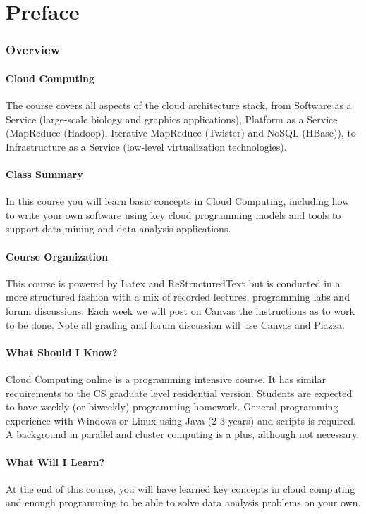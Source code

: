\part{Preface}

\section{Overview}

\subsection{Cloud Computing}
The course covers all aspects of the cloud architecture stack, from Software as
a Service (large-scale biology and graphics applications), Platform as a
Service (MapReduce (Hadoop), Iterative MapReduce (Twister) and NoSQL (HBase)),
to Infrastructure as a Service (low-level virtualization technologies).

\subsection{Class Summary}
In this course you will learn basic concepts in Cloud Computing, including how
to write your own software using key cloud programming models and tools to
support data mining and data analysis applications.

\subsection{Course Organization}
This course is powered by Latex and ReStructuredText but is conducted in a
more structured fashion with a mix of recorded lectures, programming labs and
forum discussions. Each week we will post on Canvas the instructions as to
work to be done. Note all grading and forum discussion will use Canvas and
Piazza.

\subsection{What Should I Know?}
Cloud Computing online is a programming intensive course. It has similar
requirements to the CS graduate level residential version. Students are
expected to have weekly (or biweekly) programming homework. General programming
experience with Windows or Linux using Java (2-3 years) and scripts is
required. A background in parallel and cluster computing is a plus, although
not necessary.

\subsection{What Will I Learn?}
At the end of this course, you will have learned key concepts in cloud
computing and enough programming to be able to solve data analysis problems on
your own.

